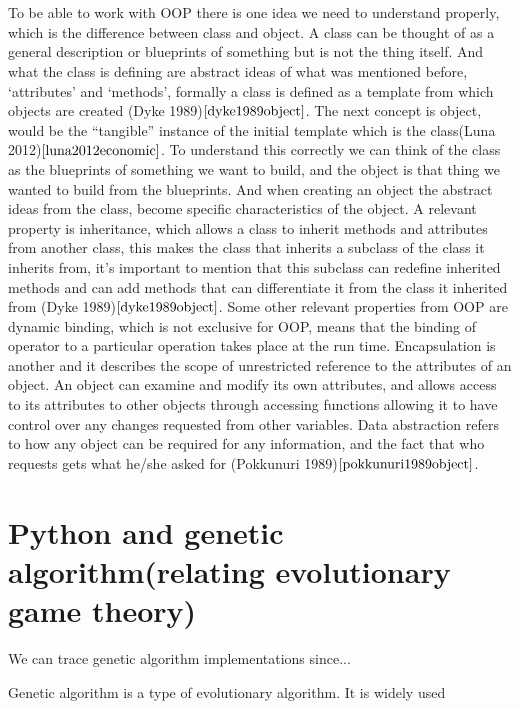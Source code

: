 \documentclass{article}
\begin{document}
\\\\To be able to work with OOP there is one idea we need to understand properly, which is the difference between class and object. A class can be thought of as a general description or blueprints of something but is not the thing itself.  And what the class is defining are abstract ideas of what was mentioned before, `attributes’ and `methods’, formally a class is defined as a template from which objects are created (Dyke 1989)$\cite{dyke1989object}$. The next concept is object,  would be the ``tangible'' instance of the initial template which is the class(Luna 2012)$\cite{luna2012economic}$. To understand this correctly we can think of the class as the blueprints of something we want to build, and the object is that thing we wanted to build from the blueprints. And when creating an object the abstract ideas from the class, become specific characteristics of the object. A relevant property is inheritance, which allows a class to inherit methods and attributes from another class, this makes the class that inherits a subclass of the class it inherits from, it’s important to mention that this subclass can redefine inherited methods and can add methods that can differentiate it from the class it inherited from (Dyke 1989)$\cite{dyke1989object}$.  Some other relevant properties from OOP are dynamic binding, which is not exclusive for OOP, means that the binding of operator to a particular operation takes place at the run time. Encapsulation is another and it describes the scope of unrestricted reference to the attributes of an object. An object can examine and modify its own attributes, and allows access to its attributes to other objects through accessing functions allowing it to have control over any changes requested from other variables. Data abstraction refers to how any object can be required for any information, and the fact that who requests gets what he/she asked for (Pokkunuri 1989)$\cite{pokkunuri1989object}$. 

\section{Python and genetic algorithm(relating evolutionary game theory)}
We can trace genetic algorithm implementations since...

Genetic algorithm is a type of evolutionary algorithm. It is widely used 
\end{document}

